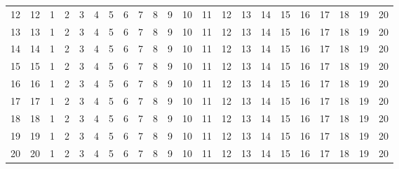\documentclass[10pt]{article}
\begin{document}
\begin{table}[ht]
\begin{tabular}{c|ccc|ccc|ccc|ccc|ccc|ccc|ccc}
    \rowcolor{LightCyan}
    12 & 12 & 1 & 2 & 3 & 4 & 5 & 6 & 7 & 8 & 9 & 10 & 11 & 12 & 13 & 14 & 15 & 16 & 17 & 18 & 19 & 20\\
    \rowcolor{LightCyan}
    13 & 13 & 1 & 2 & 3 & 4 & 5 & 6 & 7 & 8 & 9 & 10 & 11 & 12 & 13 & 14 & 15 & 16 & 17 & 18 & 19 & 20\\
    \rowcolor{LightCyan}
    14 & 14 & 1 & 2 & 3 & 4 & 5 & 6 & 7 & 8 & 9 & 10 & 11 & 12 & 13 & 14 & 15 & 16 & 17 & 18 & 19 & 20\\

    15 & 15 & 1 & 2 & 3 & 4 & 5 & 6 & 7 & 8 & 9 & 10 & 11 & 12 & 13 & 14 & 15 & 16 & 17 & 18 & 19 & 20\\
    16 & 16 & 1 & 2 & 3 & 4 & 5 & 6 & 7 & 8 & 9 & 10 & 11 & 12 & 13 & 14 & 15 & 16 & 17 & 18 & 19 & 20\\
    17 & 17 & 1 & 2 & 3 & 4 & 5 & 6 & 7 & 8 & 9 & 10 & 11 & 12 & 13 & 14 & 15 & 16 & 17 & 18 & 19 & 20\\

    \rowcolor{LightCyan}
    18 & 18 & 1 & 2 & 3 & 4 & 5 & 6 & 7 & 8 & 9 & 10 & 11 & 12 & 13 & 14 & 15 & 16 & 17 & 18 & 19 & 20\\
    \rowcolor{LightCyan}
    19 & 19 & 1 & 2 & 3 & 4 & 5 & 6 & 7 & 8 & 9 & 10 & 11 & 12 & 13 & 14 & 15 & 16 & 17 & 18 & 19 & 20\\
    \rowcolor{LightCyan}
    20 & 20 & 1 & 2 & 3 & 4 & 5 & 6 & 7 & 8 & 9 & 10 & 11 & 12 & 13 & 14 & 15 & 16 & 17 & 18 & 19 & 20\\

    \hline
  \end{tabular}
\end{table}
\end{document}
